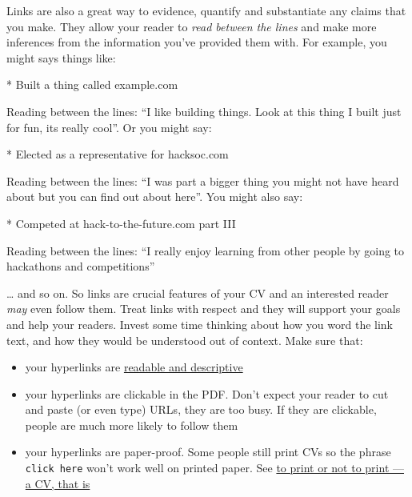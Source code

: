 \documentclass[
]{book}
\newenvironment{Shaded}{\begin{snugshade}}{\end{snugshade}}
\newcommand{\NormalTok}[1]{#1}
\newcommand{\SpecialStringTok}[1]{\textcolor[rgb]{0.31,0.60,0.02}{#1}}
\providecommand{\tightlist}{%
  \setlength{\itemsep}{0pt}\setlength{\parskip}{0pt}}
\begin{document}
Links are also a great way to evidence, quantify and substantiate any claims that you make. They allow your reader to \emph{read between the lines} and make more inferences from the information you've provided them with. For example, you might says things like:

\begin{Shaded}
\begin{Highlighting}[]
\SpecialStringTok{* }\NormalTok{Built a thing called example.com}
\end{Highlighting}
\end{Shaded}

Reading between the lines: ``I like building things. Look at this thing I built just for fun, its really cool''. Or you might say:

\begin{Shaded}
\begin{Highlighting}[]
\SpecialStringTok{* }\NormalTok{Elected as a representative for hacksoc.com}
\end{Highlighting}
\end{Shaded}

Reading between the lines: ``I was part a bigger thing you might not have heard about but you can find out about here''. You might also say:

\begin{Shaded}
\begin{Highlighting}[]
\SpecialStringTok{* }\NormalTok{Competed at hack{-}to{-}the{-}future.com part III}
\end{Highlighting}
\end{Shaded}

Reading between the lines: ``I really enjoy learning from other people by going to hackathons and competitions''

\ldots{} and so on. So links are crucial features of your CV and an interested reader \emph{may} even follow them. Treat links with respect and they will support your goals and help your readers. Invest some time thinking about how you word the link text, and how they would be understood out of context. Make sure that:

\begin{itemize}
\tightlist
\item
  your hyperlinks are \href{https://readabilityguidelines.co.uk/content-design/links/}{readable and descriptive} \citep{readable}\\
\item
  your hyperlinks are clickable in the PDF. Don't expect your reader to cut and paste (or even type) URLs, they are too busy. If they are clickable, people are much more likely to follow them
\item
  your hyperlinks are paper-proof. Some people still print CVs so the phrase \texttt{click\ here} won't work well on printed paper. See \href{https://www.bbc.com/worklife/article/20140620-to-print-or-not-to-print}{to print or not to print --- a CV, that is} \citep{printcv}
\end{itemize}
\end{document}

